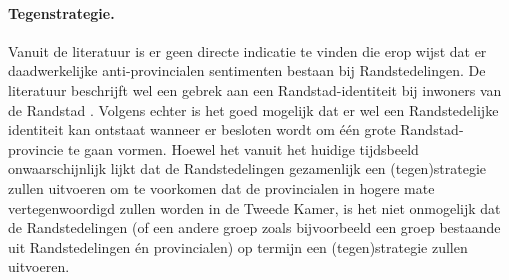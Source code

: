 \paragraph{Tegenstrategie.}
Vanuit de literatuur is er geen directe indicatie te vinden die erop wijst dat er daadwerkelijke anti-provincialen sentimenten bestaan bij Randstedelingen. De literatuur beschrijft wel een gebrek aan een Randstad-identiteit bij inwoners van de Randstad \citep{meijers2001deltametropool,terlouw2010randstad}. Volgens \cite{terlouw2010randstad} echter is het goed mogelijk dat er wel een Randstedelijke identiteit kan ontstaat wanneer er besloten wordt om één grote Randstad-provincie te gaan vormen. Hoewel het vanuit het huidige tijdsbeeld onwaarschijnlijk lijkt dat de Randstedelingen gezamenlijk een (tegen)strategie zullen uitvoeren om te voorkomen dat de provincialen in hogere mate vertegenwoordigd zullen worden in de Tweede Kamer, is het niet onmogelijk dat de Randstedelingen (of een andere groep zoals bijvoorbeeld een groep bestaande uit Randstedelingen én provincialen) op termijn een (tegen)strategie zullen uitvoeren. 


